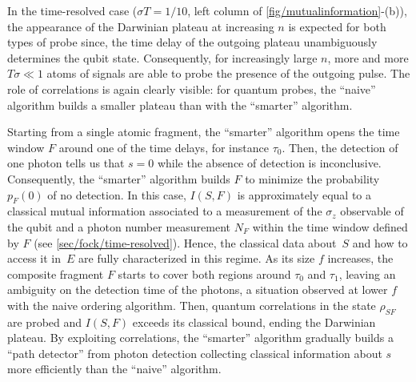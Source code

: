 In the time-resolved case 
($\sigma T=1/10$, left column of \cref{fig/mutualinformation}-(b)), 
the appearance of the Darwinian plateau at increasing $n$
is expected for both types of probe since, the time delay of the 
outgoing plateau unambiguously determines
the qubit state. Consequently, for increasingly large $n$, more and more
$T\sigma\ll 1$ atoms of signals are able to probe the presence of the 
outgoing pulse. The role of correlations is again
clearly visible: for quantum probes, the ``naive'' algorithm builds a
smaller plateau than with the ``smarter'' algorithm.

Starting from a single atomic fragment, the ``smarter'' algorithm opens 
the time window $F$ around one of the time delays, for instance 
$\tau_0$. Then, the detection of one photon tells us that $s=0$ while
the absence of detection is inconclusive. Consequently, the ``smarter'' 
algorithm builds $F$ to minimize the probability $p_F(0)$ of no 
detection. In this case, $I(S,F)$ is approximately equal to a
classical mutual information associated to a measurement of the 
$\sigma_z$ observable of the qubit and a photon number measurement 
$N_F$ within the time window defined by $F$ (see 
\cref{sec/fock/time-resolved}). Hence, the classical data about~$S$ and
how to access it in~$E$ are fully characterized in this regime. As its 
size $f$ increases, the composite fragment $F$ starts to cover both 
regions around $\tau_0$ and $\tau_1$, leaving an ambiguity on the 
detection time of the photons, a situation observed at lower $f$ with 
the naive ordering algorithm. Then, quantum correlations in the state 
$\rho_{SF}$ are probed and $I(S,F)$ exceeds its
classical bound, ending the Darwinian plateau. 
By exploiting correlations, the ``smarter'' algorithm 
gradually builds a ``path detector'' from photon detection
collecting classical information about $s$
more efficiently than the ``naive'' algorithm.

